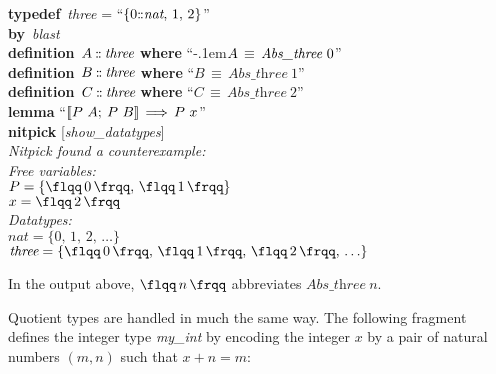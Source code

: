 \documentclass[a4paper,12pt]{article}
\def\Colon{\mathord{:\mkern-1.5mu:}}
\def\unr{\ldots}
\def\Abs#1{\hbox{\rm{\flqq}}{\,#1\,}\hbox{\rm{\frqq}}}
\begin{document}
\prew
\textbf{typedef}~\textit{three} = ``$\{0\Colon\textit{nat},\, 1,\, 2\}$'' \\
\textbf{by}~\textit{blast} \\[2\smallskipamount]
\textbf{definition}~$A \mathbin{\Colon} \textit{three}$ \textbf{where} ``\kern-.1em$A \,\equiv\, \textit{Abs\_\allowbreak three}~0$'' \\
\textbf{definition}~$B \mathbin{\Colon} \textit{three}$ \textbf{where} ``$B \,\equiv\, \textit{Abs\_three}~1$'' \\
\textbf{definition}~$C \mathbin{\Colon} \textit{three}$ \textbf{where} ``$C \,\equiv\, \textit{Abs\_three}~2$'' \\[2\smallskipamount]
\textbf{lemma} ``$\mathopen{[\![} P~A;\> P~B\mathclose{]\!]} \,\Longrightarrow\, P~x$'' \\
\textbf{nitpick} [\textit{show\_datatypes}] \\[2\smallskipamount]
\slshape Nitpick found a counterexample: \\[2\smallskipamount]
\hbox{}\qquad Free variables: \nopagebreak \\
\hbox{}\qquad\qquad $P = \{\Abs{0},\, \Abs{1}\}$ \\
\hbox{}\qquad\qquad $x = \Abs{2}$ \\
\hbox{}\qquad Datatypes: \\
\hbox{}\qquad\qquad $\textit{nat} = \{0,\, 1,\, 2,\, \unr\}$ \\
\hbox{}\qquad\qquad $\textit{three} = \{\Abs{0},\, \Abs{1},\, \Abs{2},\, \unr\}$
\postw

In the output above, $\Abs{n}$ abbreviates $\textit{Abs\_three}~n$.

Quotient types are handled in much the same way. The following fragment defines
the integer type \textit{my\_int} by encoding the integer $x$ by a pair of
natural numbers $(m, n)$ such that $x + n = m$:
\end{document}
